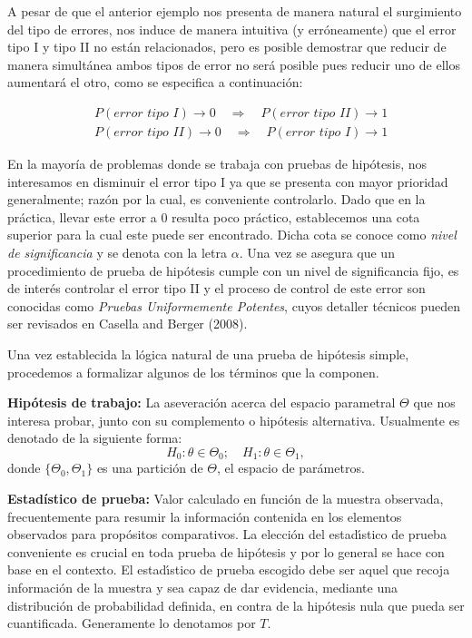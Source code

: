 \documentclass{article}
\theoremstyle{definition}
\begin{document}
A pesar de que el anterior ejemplo nos presenta de manera natural el surgimiento del tipo de errores, nos induce de manera intuitiva (y erróneamente) que el error tipo I y tipo II no están relacionados, pero es posible demostrar que reducir de manera simultánea ambos tipos de error no será posible pues reducir uno de
ellos aumentará el otro, como se especifica a continuación:

\begin{align*}
	&P(\textit{error tipo I})\to0\quad \Longrightarrow \quad P(\textit{error tipo II} )\to 1\\
	&P(\textit{error tipo II})\to0 \quad\Longrightarrow \quad P(\textit{error tipo I} )\to 1
\end{align*}

En la mayoría de problemas donde se trabaja con pruebas de hipótesis, nos interesamos en disminuir el error tipo I ya que se presenta con mayor prioridad generalmente; razón por la cual, es conveniente controlarlo. Dado que en la práctica, llevar este error a 0 resulta poco práctico, establecemos una cota superior para la cual este puede ser encontrado. Dicha cota se conoce como \textit{nivel de significancia} y se denota con la letra $\alpha$.  Una vez se asegura que un procedimiento de prueba de hipótesis cumple con un nivel de significancia fijo, es de interés controlar el error tipo II y el proceso de control de este error son conocidas como \textit{Pruebas Uniformemente Potentes}, cuyos detaller técnicos pueden ser revisados en Casella and Berger (2008).

Una vez establecida la lógica natural de una prueba de hipótesis simple, procedemos a formalizar algunos de los términos que la componen.

\textbf{Hipótesis de trabajo:} La aseveración acerca del espacio parametral $\Theta$ que nos interesa probar,
junto con su complemento o hipótesis alternativa. Usualmente es denotado de la siguiente forma:
$$H_0:\theta\in\Theta_0; \quad H_1: \theta\in\Theta_1,$$
donde $\{\Theta_0,\Theta_1\}$ es una partición de $\Theta$, el espacio de parámetros.

\textbf{Estadístico de prueba:} Valor calculado en función de la muestra observada, frecuentemente
para resumir la información contenida en los elementos observados para propósitos comparativos.
La elección del estadı́stico de prueba conveniente es crucial en toda prueba de hipótesis y por lo
general se hace con base en el contexto. El estadı́stico de prueba escogido debe ser aquel que recoja
información de la muestra y sea capaz de dar evidencia, mediante una distribución de probabilidad
definida, en contra de la hipótesis nula que pueda ser cuantificada. Generamente lo denotamos por $T$.
\end{document}
